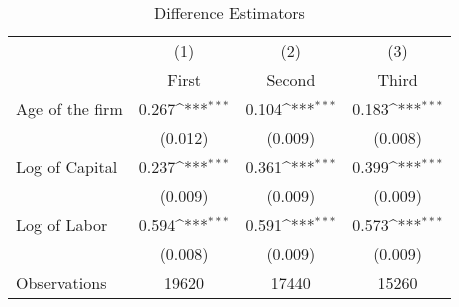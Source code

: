 \begin{table}[htbp]\centering
\def\sym#1{\ifmmode^{#1}\else\(^{#1}\)\fi}
\caption{Difference Estimators \label{tab:q3}}
\begin{tabular}{l*{3}{c}}
\toprule
                    &\multicolumn{1}{c}{(1)}&\multicolumn{1}{c}{(2)}&\multicolumn{1}{c}{(3)}\\
                    &\multicolumn{1}{c}{First}&\multicolumn{1}{c}{Second}&\multicolumn{1}{c}{Third}\\
\midrule
Age of the firm     &       0.267\sym{***}&       0.104\sym{***}&       0.183\sym{***}\\
                    &     (0.012)         &     (0.009)         &     (0.008)         \\
\addlinespace
Log of Capital      &       0.237\sym{***}&       0.361\sym{***}&       0.399\sym{***}\\
                    &     (0.009)         &     (0.009)         &     (0.009)         \\
\addlinespace
Log of Labor        &       0.594\sym{***}&       0.591\sym{***}&       0.573\sym{***}\\
                    &     (0.008)         &     (0.009)         &     (0.009)         \\
\midrule
Observations        &       19620         &       17440         &       15260         \\
\bottomrule
\end{tabular}
\end{table}
